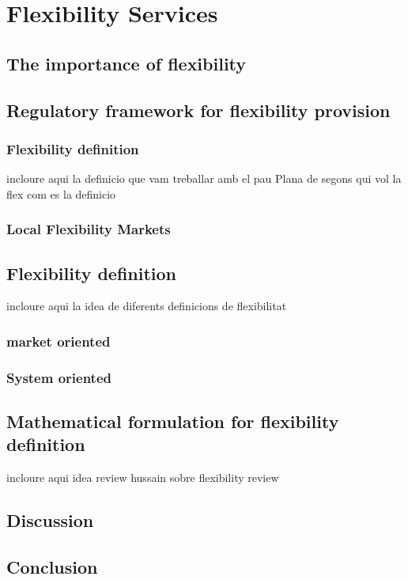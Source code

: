 \chapter{Flexibility Services}
\label{chapterFlexibility}

\section{The importance of flexibility}

\section{Regulatory framework for flexibility provision}
	\subsection{Flexibility definition}
	incloure aqui la definicio que vam treballar amb el pau Plana de segons qui vol la flex com es la definicio
	\subsection{Local Flexibility Markets}
	
\section{Flexibility definition}
incloure aqui la idea de diferents definicions de flexibilitat
\subsection{market oriented}
\subsection{System oriented}

\section{Mathematical formulation for flexibility definition}
incloure aqui idea review hussain sobre flexibility review 

\section{Discussion}
\section{Conclusion}

	


